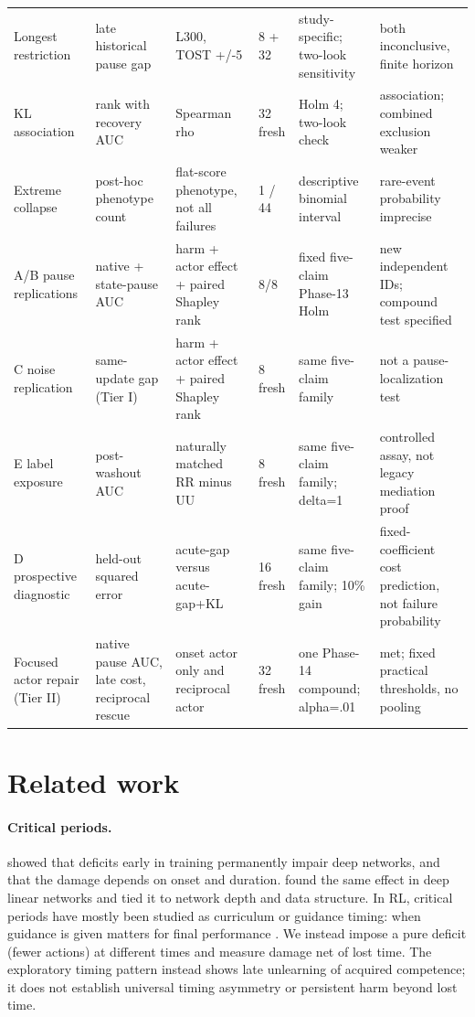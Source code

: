 \documentclass[10pt]{article} %
\begin{document}
\begin{table}[t]
{\begin{tabular}{p{2.3cm}p{2.1cm}p{3.0cm}p{1.0cm}p{2.5cm}p{2.8cm}}
Longest restriction & late historical pause gap & L300, TOST +/-5 & 8 + 32 & study-specific; two-look sensitivity & both inconclusive, finite horizon \\
KL association & rank with recovery AUC & Spearman rho & 32 fresh & Holm 4; two-look check & association; combined exclusion weaker \\
Extreme collapse & post-hoc phenotype count & flat-score phenotype, not all failures & 1 / 44 & descriptive binomial interval & rare-event probability imprecise \\
A/B pause replications & native + state-pause AUC & harm + actor effect + paired Shapley rank & 8/8 & fixed five-claim Phase-13 Holm & new independent IDs; compound test specified \\
C noise replication & same-update gap (Tier I) & harm + actor effect + paired Shapley rank & 8 fresh & same five-claim family & not a pause-localization test \\
E label exposure & post-washout AUC & naturally matched RR minus UU & 8 fresh & same five-claim family; delta=1 & controlled assay, not legacy mediation proof \\
D prospective diagnostic & held-out squared error & acute-gap versus acute-gap+KL & 16 fresh & same five-claim family; 10\% gain & fixed-coefficient cost prediction, not failure probability \\
Focused actor repair (Tier II) & native pause AUC, late cost, reciprocal rescue & onset actor only and reciprocal actor & 32 fresh & one Phase-14 compound; alpha=.01 & met; fixed practical thresholds, no pooling \\
\bottomrule
\end{tabular}}
\end{table}

\section{Related work}

\paragraph{Critical periods.}
\citet{achille2019critical} showed that deficits early in training permanently impair deep networks, and that the damage depends on onset and duration. \citet{kleinman2024critical} found the same effect in deep linear networks and tied it to network depth and data structure. In RL, critical periods have mostly been studied as curriculum or guidance timing: when guidance is given matters for final performance \citep{park2021toddler,park2022multistage,dekleijn2022critical}. We instead impose a pure deficit (fewer actions) at different times and measure damage net of lost time. The exploratory timing pattern instead shows late unlearning of acquired competence; it does not establish universal timing asymmetry or persistent harm beyond lost time.
\end{document}
